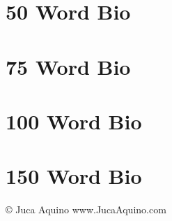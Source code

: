 \documentclass[10pt]{article}
\begin{document}
\section*{ 50 Word Bio} 
\section*{ 75 Word Bio} 
\section*{100 Word Bio} 
\section*{150 Word Bio} 

\vspace*{\fill}

\copyright{} \the\year{} Juca Aquino \hfill www.JucaAquino.com
\end{document}
